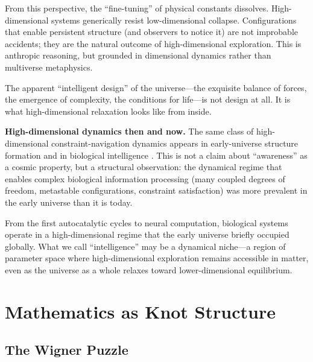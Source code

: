 \documentclass[11pt,a4paper]{article}
\begin{document}
From this perspective, the ``fine-tuning'' of physical constants dissolves. High-dimensional systems generically resist low-dimensional collapse. Configurations that enable persistent structure (and observers to notice it) are not improbable accidents; they are the natural outcome of high-dimensional exploration. This is anthropic reasoning, but grounded in dimensional dynamics rather than multiverse metaphysics.

The apparent ``intelligent design'' of the universe---the exquisite balance of forces, the emergence of complexity, the conditions for life---is not design at all. It is what high-dimensional relaxation looks like from inside.

\textbf{High-dimensional dynamics then and now.} The same class of high-dimensional constraint-navigation dynamics appears in early-universe structure formation and in biological intelligence \cite{todd2026intelligence}. This is not a claim about ``awareness'' as a cosmic property, but a structural observation: the dynamical regime that enables complex biological information processing (many coupled degrees of freedom, metastable configurations, constraint satisfaction) was more prevalent in the early universe than it is today.

From the first autocatalytic cycles to neural computation, biological systems operate in a high-dimensional regime that the early universe briefly occupied globally. What we call ``intelligence'' may be a dynamical niche---a region of parameter space where high-dimensional exploration remains accessible in matter, even as the universe as a whole relaxes toward lower-dimensional equilibrium.

\section{Mathematics as Knot Structure}

\noindent{}

\subsection{The Wigner Puzzle}
\end{document}
